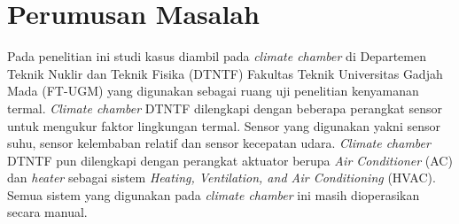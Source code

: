 


\section{Perumusan Masalah}
Pada penelitian ini studi kasus diambil pada \textit{climate chamber} di Departemen Teknik Nuklir dan Teknik Fisika (DTNTF) Fakultas Teknik Universitas Gadjah Mada (FT-UGM) yang digunakan sebagai ruang uji penelitian kenyamanan termal. \textit{Climate chamber} DTNTF dilengkapi dengan beberapa perangkat sensor untuk mengukur faktor lingkungan termal. Sensor yang digunakan yakni sensor suhu, sensor kelembaban relatif dan sensor kecepatan udara. \textit{Climate chamber} DTNTF pun dilengkapi dengan perangkat aktuator berupa \textit{Air Conditioner} (AC) dan \textit{heater} sebagai sistem \textit{Heating, Ventilation, and Air Conditioning} (HVAC). Semua sistem yang digunakan pada \textit{climate chamber} ini masih dioperasikan secara manual.

